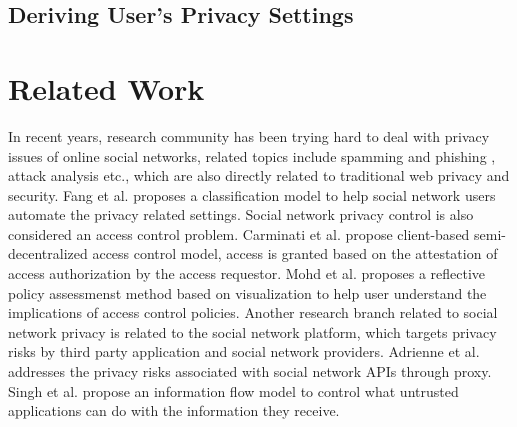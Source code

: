 \documentclass[a4paper]{article}
\begin{document}
\subsection{Deriving User's Privacy Settings}


\section{Related Work}

In recent years, research community has been trying hard to deal with
privacy issues of online social networks, related topics include
spamming and phishing \cite{twitter-spam, SN-explore-spam,
SN-automated-cheap-spam, social-spam-detection, video-spam-youtube},
attack analysis \cite{neighborhood-attack, 1658958,
group-deanonymization-attack, anony-link-attack,
identity-theft-attack, sybil-attack, 1608132} etc., which are also
directly related to traditional web privacy and security. Fang et
al. \cite{privacy-wizard} proposes a classification model to help
social network users automate the privacy related settings. Social
network privacy control is also considered an access control
problem. Carminati et al. \cite{crypto-collaborative-ac,
rule-based-ac} propose client-based semi-decentralized access control
model, access is granted based on the attestation of access
authorization by the access requestor. Mohd et
al. \cite{Anwar_visualizingprivacy} proposes a reflective policy
assessmenst method based on visualization to help user understand the
implications of access control policies. Another research branch
related to social network privacy is related to the social network
platform, which targets privacy risks by third party application and
social network providers. Adrienne et
al. \cite{Felt08privacyprotection} addresses the privacy risks
associated with social network APIs through proxy. Singh et
al. \cite{xbook-social-platform} propose an information flow model to
control what untrusted applications can do with the information they
receive.
\end{document}
